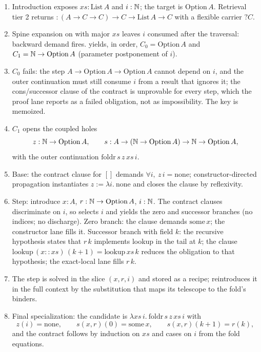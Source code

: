 \begin{enumerate}
\item Introduction exposes $xs : \mathrm{List}\,A$ and $i : \mathbb{N}$; the target is $\mathrm{Option}\,A$. Retrieval tier 2 returns  $: (A \to C \to C) \to C \to \mathrm{List}\,A \to C$ with a flexible carrier $?C$.
\item Spine expansion on  with major $xs$ leaves $i$ consumed after the traversal: backward demand fires.  yields, in order, $C_0 = \mathrm{Option}\,A$ and $C_1 = \mathbb{N} \to \mathrm{Option}\,A$ (parameter postponement of $i$).
\item $C_0$ fails: the step $A \to \mathrm{Option}\,A \to \mathrm{Option}\,A$ cannot depend on $i$, and the outer continuation must still consume $i$ from a result that ignores it; the cons/successor clause of the contract is unprovable for every step, which the proof lane reports as a failed obligation, not as impossibility. The key is memoized.
\item $C_1$ opens the coupled holes
\[
 z : \mathbb{N} \to \mathrm{Option}\,A, \qquad s : A \to (\mathbb{N} \to \mathrm{Option}\,A) \to \mathbb{N} \to \mathrm{Option}\,A,
\]
with the outer continuation $\mathrm{foldr}\,s\,z\,xs\,i$.
\item Base: the contract clause for $[]$ demands $\forall i,\ z\,i = \mathrm{none}$; constructor-directed propagation instantiates $z := \lambda i.\ \mathrm{none}$ and closes the clause by reflexivity.
\item Step: introduce $x : A$, $r : \mathbb{N} \to \mathrm{Option}\,A$, $i : \mathbb{N}$. The contract clauses discriminate on $i$, so  selects $i$ and  yields the zero and successor branches (no indices; no discharge). Zero branch: the clause demands $\mathrm{some}\,x$; the constructor lane fills it. Successor branch with field $k$: the recursive hypothesis states that $r\,k$ implements lookup in the tail at $k$; the clause $\mathrm{lookup}\,(x :: xs)\,(k+1) = \mathrm{lookup}\,xs\,k$ reduces the obligation to that hypothesis; the exact-local lane fills $r\,k$.
\item The step is solved in the slice $(x, r, i)$ and stored as a recipe;  reintroduces it in the full context by the substitution that maps its telescope to the fold's binders.
\item Final specialization: the candidate is $\lambda xs\, i.\ \mathrm{foldr}\,s\,z\,xs\,i$ with
\[
 z(i) = \mathrm{none}, \qquad s(x, r)(0) = \mathrm{some}\,x, \qquad s(x, r)(k+1) = r(k),
\]
and the contract follows by induction on $xs$ and cases on $i$ from the fold equations.
\end{enumerate}

